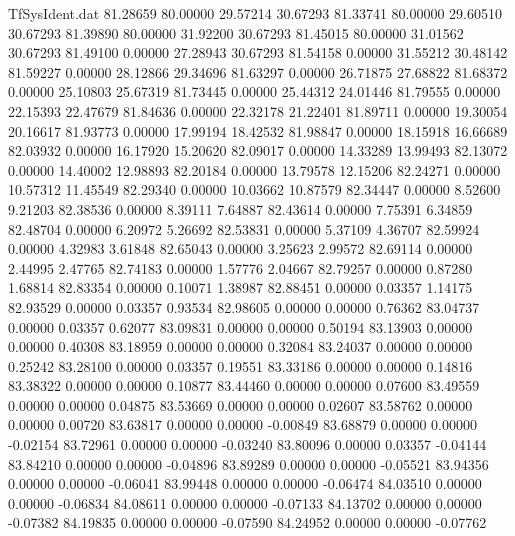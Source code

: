 \begin{filecontents}{TfSysIdent.dat}
  81.28659   80.00000   29.57214   30.67293
  81.33741   80.00000   29.60510   30.67293
  81.39890   80.00000   31.92200   30.67293
  81.45015   80.00000   31.01562   30.67293
  81.49100    0.00000   27.28943   30.67293
  81.54158    0.00000   31.55212   30.48142
  81.59227    0.00000   28.12866   29.34696
  81.63297    0.00000   26.71875   27.68822
  81.68372    0.00000   25.10803   25.67319
  81.73445    0.00000   25.44312   24.01446
  81.79555    0.00000   22.15393   22.47679
  81.84636    0.00000   22.32178   21.22401
  81.89711    0.00000   19.30054   20.16617
  81.93773    0.00000   17.99194   18.42532
  81.98847    0.00000   18.15918   16.66689
  82.03932    0.00000   16.17920   15.20620
  82.09017    0.00000   14.33289   13.99493
  82.13072    0.00000   14.40002   12.98893
  82.20184    0.00000   13.79578   12.15206
  82.24271    0.00000   10.57312   11.45549
  82.29340    0.00000   10.03662   10.87579
  82.34447    0.00000    8.52600    9.21203
  82.38536    0.00000    8.39111    7.64887
  82.43614    0.00000    7.75391    6.34859
  82.48704    0.00000    6.20972    5.26692
  82.53831    0.00000    5.37109    4.36707
  82.59924    0.00000    4.32983    3.61848
  82.65043    0.00000    3.25623    2.99572
  82.69114    0.00000    2.44995    2.47765
  82.74183    0.00000    1.57776    2.04667
  82.79257    0.00000    0.87280    1.68814
  82.83354    0.00000    0.10071    1.38987
  82.88451    0.00000    0.03357    1.14175
  82.93529    0.00000    0.03357    0.93534
  82.98605    0.00000    0.00000    0.76362
  83.04737    0.00000    0.03357    0.62077
  83.09831    0.00000    0.00000    0.50194
  83.13903    0.00000    0.00000    0.40308
  83.18959    0.00000    0.00000    0.32084
  83.24037    0.00000    0.00000    0.25242
  83.28100    0.00000    0.03357    0.19551
  83.33186    0.00000    0.00000    0.14816
  83.38322    0.00000    0.00000    0.10877
  83.44460    0.00000    0.00000    0.07600
  83.49559    0.00000    0.00000    0.04875
  83.53669    0.00000    0.00000    0.02607
  83.58762    0.00000    0.00000    0.00720
  83.63817    0.00000    0.00000   -0.00849
  83.68879    0.00000    0.00000   -0.02154
  83.72961    0.00000    0.00000   -0.03240
  83.80096    0.00000    0.03357   -0.04144
  83.84210    0.00000    0.00000   -0.04896
  83.89289    0.00000    0.00000   -0.05521
  83.94356    0.00000    0.00000   -0.06041
  83.99448    0.00000    0.00000   -0.06474
  84.03510    0.00000    0.00000   -0.06834
  84.08611    0.00000    0.00000   -0.07133
  84.13702    0.00000    0.00000   -0.07382
  84.19835    0.00000    0.00000   -0.07590
  84.24952    0.00000    0.00000   -0.07762

\end{filecontents}
